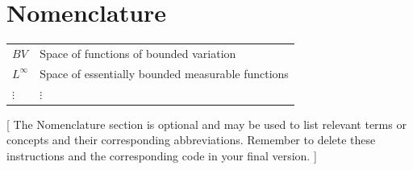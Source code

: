 \chapter*{Nomenclature}

{
  \renewcommand{\arraystretch}{1.5}
  \begin{longtable}[htbp]{@{}p{} p{}@{}}
    $BV$            & Space of functions of bounded variation \\
    $L^\infty$      & Space of essentially bounded measurable functions \\
    $\vdots$          & $\vdots$\\
  \end{longtable}
}

\begin{center}
  [
    The Nomenclature section is optional and may be used to list relevant terms or concepts and their corresponding abbreviations.
    Remember to delete these instructions and the corresponding code in your final version.
  ]
\end{center}
